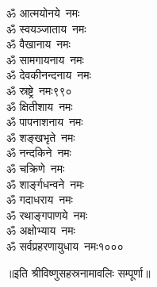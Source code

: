 \begin{multicols}{2}
\begin{flushleft}
ॐ आत्मयोनये~नमः\\
ॐ स्वयञ्जाताय~नमः\\
ॐ वैखानाय~नमः\\
ॐ सामगायनाय~नमः\\
ॐ देवकीनन्दनाय~नमः\\
ॐ स्रष्ट्रे~नमः\hfill ९९०\\
ॐ क्षितीशाय~नमः\\
ॐ पापनाशनाय~नमः\\
ॐ शङ्खभृते~नमः\\
ॐ नन्दकिने~नमः\\
ॐ चक्रिणे~नमः\\
ॐ शार्ङ्गधन्वने~नमः\\
ॐ गदाधराय~नमः\\
ॐ रथाङ्गपाणये~नमः\\
ॐ अक्षोभ्याय~नमः\\
ॐ सर्वप्रहरणायुधाय~नमः\hfill १०००
\end{flushleft}
\end{multicols}
॥इति श्रीविष्णुसहस्रनामावलिः सम्पूर्णा॥